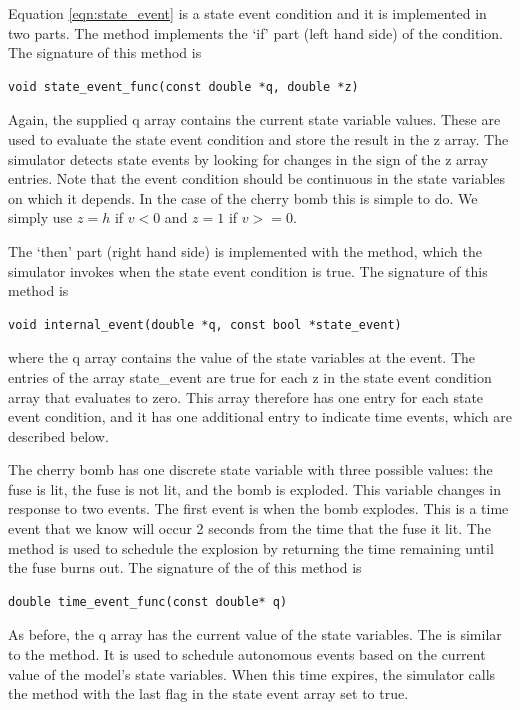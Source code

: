 Equation \ref{eqn:state_event} is a state event condition and it is implemented in two parts. The  method implements the `if' part (left hand side) of the condition. The signature of this method is
\begin{verbatim}
void state_event_func(const double *q, double *z)
\end{verbatim}
Again, the supplied q array contains the current state variable values. These are used to evaluate the state event condition and store the result in the z array. The simulator detects state events by looking for changes in the sign of the z array entries. Note that the event condition should be continuous in the state variables on which it depends. In the case of the cherry bomb this is simple to do. We simply use $z=h$ if $v < 0$ and $z=1$ if $v >= 0$.  

The `then' part (right hand side) is implemented with the  method, which the simulator invokes when the state event condition is true. The signature of this method is
\begin{verbatim}
void internal_event(double *q, const bool *state_event)
\end{verbatim}
where the q array contains the value of the state variables at the event. The entries of the array state\_event are true for each z in the state event condition array that evaluates to zero. This array therefore has one entry for each state event condition, and it has one additional entry to indicate time events, which are described below.

The cherry bomb has one discrete state variable with three possible values: the fuse is lit, the fuse is not lit, and the bomb is exploded. This variable changes in response to two events. The first event is when the bomb explodes. This is a time event that we know will occur 2 seconds from the time that the fuse it lit. The  method is used to schedule the explosion by returning the time remaining until the fuse burns out. The signature of the of this method is
\begin{verbatim}
double time_event_func(const double* q)
\end{verbatim}
As before, the q array has the current value of the state variables. The  is similar to the  method. It is used to schedule autonomous events based on the current value of the model's state variables. When this time expires, the simulator calls the  method with the last flag in the state event array set to true.

